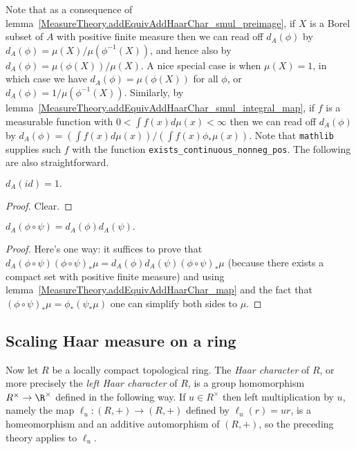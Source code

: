 Note that as a consequence of lemma~\ref{MeasureTheory.addEquivAddHaarChar_smul_preimage},
if $X$ is a Borel subset of $A$ with positive finite measure then we can read
off $d_A(\phi)$ by $d_A(\phi)=\mu(X)/\mu(\phi^{-1}(X))$, and hence also by
$d_A(\phi)=\mu(\phi(X))/\mu(X)$. A nice special case is when
$\mu(X)=1$, in which case we have $d_A(\phi)=\mu(\phi(X))$ for all $\phi$,
or $d_A(\phi)=1/\mu(\phi^{-1}(X))$.
Similarly, by lemma~\ref{MeasureTheory.addEquivAddHaarChar_smul_integral_map},
if $f$ is a measurable function with $0<\int f(x)d\mu(x)<\infty$ then
we can read off $d_A(\phi)$ by $d_A(\phi)=(\int f(x)d\mu(x))/(\int f(x)\phi_*\mu(x))$.
Note that {\tt mathlib} supplies such $f$ with the function {\tt exists\_continuous\_nonneg\_pos}.
The following are also straightforward.

\begin{lemma}
  \label{MeasureTheory.addEquivAddHaarChar_refl}
  \leanok
  $d_A(id)=1.$
\end{lemma}
\begin{proof}
  \leanok
  Clear.
\end{proof}

\begin{lemma}
  \label{MeasureTheory.addEquivAddHaarChar_trans}
  \leanok
  $d_A(\phi\circ\psi)=d_A(\phi)d_A(\psi).$
\end{lemma}
\begin{proof}
  \leanok
  Here's one way: it suffices to prove that
  $d_A(\phi\circ\psi)(\phi\circ\psi)_*\mu=d_A(\phi)d_A(\psi)(\phi\circ\psi)_*\mu$
  (because there exists a compact set with positive finite measure)
  and using lemma~\ref{MeasureTheory.addEquivAddHaarChar_map}
  and the fact that $(\phi\circ\psi)_*\mu=\phi_*(\psi_*\mu)$
  one can simplify both sides to $\mu$.
\end{proof}

\subsection{Scaling Haar measure on a ring}

Now let $R$ be a locally compact topological ring. The \emph{Haar character} of $R$,
or more precisely the \emph{left Haar character} of $R$, is a group homomorphism
$R^\times\to\R^\times$ defined in the following way. If $u\in R^\times$ then left multiplication
by $u$, namely the map $\ell_u:(R,+)\to(R,+)$ defined by $\ell_u(r)=ur$, is a homeomorphism and
an additive automorphism of $(R,+)$, so the preceding theory applies to $\ell_u$.

